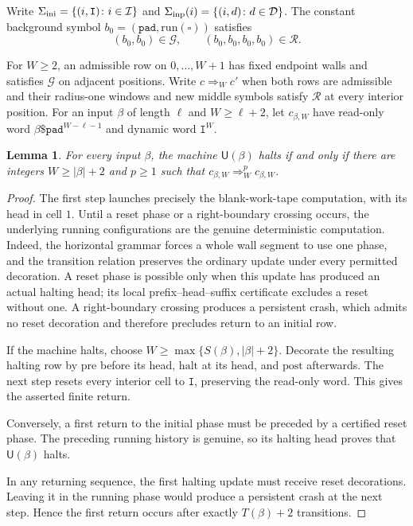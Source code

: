 \documentclass[10pt]{article}
\numberwithin{equation}{section}
\newtheorem{lemma}[lemma]{Lemma}\aliascntresetthe{lemma}
\theoremstyle{definition}
\begin{document}
Write $\Sigma_{\rm ini}=\{(i,\mathtt I)\colon i\in\mathcal I\}$ and $\Sigma_{\rm inp}(i)=\{(i,d)\colon d\in\mathcal D\}$. The constant background symbol $b_0=(\mathtt{pad},\mathrm{run}(\square))$ satisfies
\begin{equation}
 (b_0,b_0)\in\mathcal G,\qquad
 (b_0,b_0,b_0,b_0)\in\mathcal R.
 \label{ttm:eq:constant-background-update}
\end{equation}

For $W\ge2$, an admissible row on $0,\ldots,W+1$ has fixed endpoint walls and satisfies $\mathcal G$ on adjacent positions. Write $c\Rightarrow_W c'$ when both rows are admissible and their radius-one windows and new middle symbols satisfy $\mathcal R$ at every interior position. For an input $\beta$ of length $\ell$ and $W\ge\ell+2$, let $c_{\beta,W}$ have read-only word $\beta\mathtt\$\mathtt{pad}^{W-\ell-1}$ and dynamic word $\mathtt I^W$.

\begin{lemma}\label{ttm:lem:reset-ca}
For every input $\beta$, the machine $\mathsf U(\beta)$ halts if and only if there are integers $W\ge|\beta|+2$ and $p\ge1$ such that $c_{\beta,W}\Rightarrow_W^p c_{\beta,W}$.
\end{lemma}
\begin{proof}
The first step launches precisely the blank-work-tape computation, with its head in cell $1$. Until a reset phase or a right-boundary crossing occurs, the underlying running configurations are the genuine deterministic computation. Indeed, the horizontal grammar forces a whole wall segment to use one phase, and the transition relation preserves the ordinary update under every permitted decoration. A reset phase is possible only when this update has produced an actual halting head; its local prefix--head--suffix certificate excludes a reset without one. A right-boundary crossing produces a persistent crash, which admits no reset decoration and therefore precludes return to an initial row.

If the machine halts, choose $W\ge\max\{S(\beta),|\beta|+2\}$. Decorate the resulting halting row by $\mathrm{pre}$ before its head, $\mathrm{halt}$ at its head, and $\mathrm{post}$ afterwards. The next step resets every interior cell to $\mathtt I$, preserving the read-only word. This gives the asserted finite return.

Conversely, a first return to the initial phase must be preceded by a certified reset phase. The preceding running history is genuine, so its halting head proves that $\mathsf U(\beta)$ halts.

In any returning sequence, the first halting update must receive reset decorations. Leaving it in the running phase would produce a persistent crash at the next step. Hence the first return occurs after exactly $T(\beta)+2$ transitions.
\end{proof}
\end{document}
